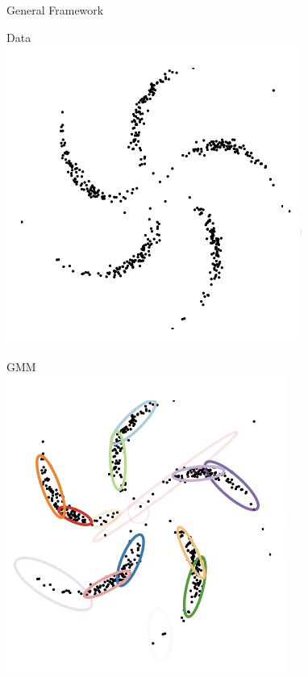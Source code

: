\documentclass[10pt]{beamer}
\begin{document}
\begin{frame}{General Framework}
\begin{minipage}[t][.9\textheight]{\textwidth}
\vfill 
  \begin{minipage}[t]{.3\textwidth}
  \begin{center}
  Data  \\
  \includegraphics[width=.7\textwidth]{images/example_data}
  \end{center}
 \end{minipage}  \hfill
  \begin{minipage}[t]{.3\textwidth}
  \begin{center}
  GMM  \\
  \includegraphics[width=.7\textwidth]{images/example_gmm}
  \end{center}
 \end{minipage}  \hfill
  \begin{minipage}[t]{.3\textwidth}

\end{minipage}
\end{minipage}
\end{frame}
\end{document}

